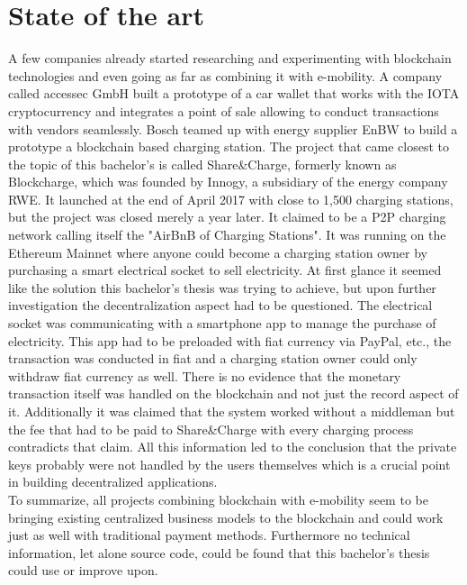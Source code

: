\section{State of the art}

A few companies already started researching and experimenting with blockchain technologies and even going as far as combining it with e-mobility. A company called accessec GmbH built a prototype of a car wallet that works with the IOTA cryptocurrency and integrates a point of sale allowing to conduct transactions with vendors seamlessly\cite{car-wallet}. Bosch teamed up with energy supplier EnBW to build a prototype a blockchain based charging station\cite{bosch-dlt}. The project that came closest to the topic of this bachelor’s is called Share\&Charge\cite{share-charge}, formerly known as Blockcharge\cite{blockcharge}, which was founded by Innogy, a subsidiary of the energy company RWE\cite{innogy}. It launched at the end of April 2017 with close to 1,500 charging stations, but the project was closed merely a year later\cite{share-charge-closed}. It claimed to be a P2P charging network calling itself the "AirBnB of Charging Stations". It was running on the Ethereum Mainnet where anyone could become a charging station owner by purchasing a smart electrical socket to sell electricity. At first glance it seemed like the solution this bachelor’s thesis was trying to achieve, but upon further investigation the decentralization aspect had to be questioned. The electrical socket was communicating with a smartphone app to manage the purchase of electricity. This app had to be preloaded with fiat currency via PayPal, etc., the transaction was conducted in fiat and a charging station owner could only withdraw fiat currency as well. There is no evidence that the monetary transaction itself was handled on the blockchain and not just the record aspect of it. Additionally it was claimed that the system worked without a middleman but the fee that had to be paid to Share\&Charge with every charging process contradicts that claim. All this information led to the conclusion that the private keys probably were not handled by the users themselves which is a crucial point in building decentralized applications.
\\
To summarize, all projects combining blockchain with e-mobility seem to be bringing existing centralized business models to the blockchain and could work just as well with traditional payment methods. Furthermore no technical information, let alone source code, could be found that this bachelor’s thesis could use or improve upon.
